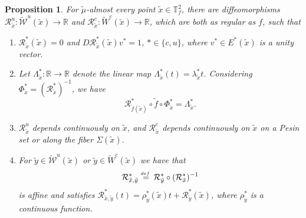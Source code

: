 \documentclass[a4paper,11pt,reqno]{amsart}
\def\tW{\widetilde W}
\newcommand{\R}{{\mathbb R}}
\newcommand{\cW}{{\mathcal W}}
\newcommand{\cR}{{\mathcal R}}
\newcommand{\eqdef}{\stackrel{\scriptscriptstyle\textrm def.}{=}}
\newcommand{\tix}{\tilde{x}}
\newcommand{\w}{\widetilde{\cW}}
\newtheorem{proposition}{Proposition}
\theoremstyle{definition}
\begin{document}
\begin{proposition}
\label{prop:formanormal}
For $\tilde{\mu}$-almost every point $\tilde{x}\in \mathbb{T}^2_f$, there are diffeomorphisms $\mathcal{R}^u_{\tix}: \w^u(\tix) \to \R$ and $\cR^c_{\tix}:\tW^c(\tix)\to\R$, which are both as regular as $f$, such that 
\begin{enumerate}
	\item $\mathcal{R}^{*}_{\tix}(\tix)=0$ and $D\mathcal{R}^{*}_{\tix}(\tix)v^{*}=1$, $* \in \{c,u\}$, where $v^{*}\in E^{*}(\tix)$ is a unity vector.
	\item Let $\Lambda^{*}_{\tix}:\R\to\R$ denote the linear map $\Lambda^{*}_{\tix}(t)=\lambda^{*}_{\tix}t$. Considering $\Phi^{*}_{\tix}=(\mathcal{R}^{*}_{\tix})^{-1}$, we have
	\[
	\mathcal{R}^{*}_{\tilde{f}(\tix)}\circ\tilde{f}\circ\Phi^{*}_{\tix}=\Lambda^{*}_{\tix}.
	\]
        \item $\mathcal{R}^u_{\tix}$ depends continuously on $\tix$, and $\mathcal{R}^c_{\tix}$ depends continuously on $\tix$ on a Pesin set or along the fiber $\Sigma(\tix)$.
        \item For $\tilde{y} \in \w^u(\tix)$ or $\tilde{y}\in \tW^c(\tix)$ we have that
            $$\mathcal{R}^{*}_{\tix, \tilde{y}} \eqdef \mathcal{R}^{*}_{\tilde{y}} \circ (\mathcal{R}^{*}_{\tix})^ {-1}$$
        is affine and satisfies $\mathcal{R}^{*}_{\tix, \tilde{y}}(t) = \rho^{*}_{\tilde{y}}(\tilde{x})t +  \mathcal{R}^{*}_{\tilde{y}}(\tix)$, where $\rho^{*}_{\tilde{y}}$ is a continuous function.
\end{enumerate}
\end{proposition}
\end{document}
